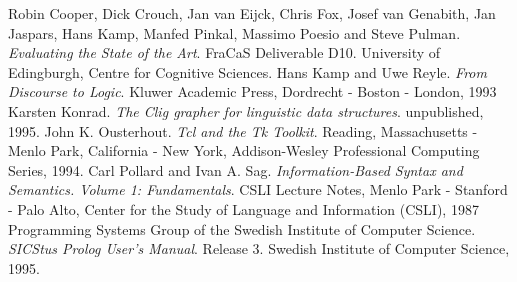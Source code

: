 \newpage
\begin{thebibliography}{kako}
        Robin Cooper, Dick Crouch, Jan van Eijck, Chris Fox,
        Josef van Genabith, Jan Jaspars, Hans Kamp,
        Manfed Pinkal, Massimo Poesio and Steve Pulman.
        {\em Evaluating the State of the Art}. FraCaS Deliverable D10.
        University of Edingburgh, Centre for Cognitive Sciences. 
    Hans Kamp and Uwe Reyle.
        {\em From Discourse to Logic}.  Kluwer Academic Press,
        Dordrecht - Boston - London, 1993 
    Karsten Konrad. {\em The {\sc Clig}
           grapher for linguistic data structures}. 
           unpublished, 1995.
    John K. Ousterhout. {\em Tcl
           and the Tk Toolkit\/}.  Reading, Massachusetts - Menlo Park,
           California - New York, Addison-Wesley Professional Computing
           Series, 1994.  
    Carl Pollard
           and Ivan A. Sag. {\em Information-Based Syntax and
           Semantics. Volume 1: Fundamentals}. CSLI Lecture Notes,
           Menlo Park - Stanford - Palo Alto, Center for the Study of 
           Language and Information (CSLI), 1987
    Programming Systems Group of the
           Swedish Institute of Computer Science. {\em SICStus Prolog
           User's Manual}. Release 3. Swedish Institute of Computer 
           Science, 1995.
\end{thebibliography}

